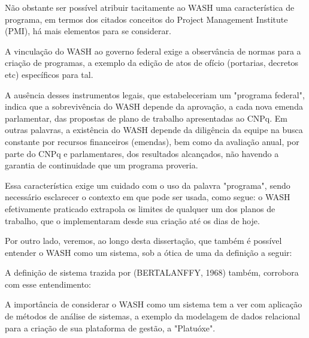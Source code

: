 Não obstante ser possível atribuir tacitamente ao WASH uma característica de programa, em termos dos citados conceitos do Project Management Institute (PMI), há mais elementos para se considerar.

A vinculação do WASH ao governo federal exige a observância de normas para a criação de programas, a exemplo da edição de atos de ofício (portarias, decretos etc) específicos para tal.

A ausência desses instrumentos legais, que estabeleceriam um "programa federal", indica que a sobrevivência do WASH depende da aprovação, a cada nova emenda parlamentar, das propostas de plano de trabalho apresentadas ao CNPq. Em outras palavras, a existência do WASH depende da diligência da equipe na busca constante por recursos financeiros (emendas), bem como da avaliação anual, por parte do CNPq e parlamentares, dos resultados alcançados, não havendo a garantia de continuidade que um programa proveria.

Essa característica exige um cuidado com o uso da palavra "programa", sendo necessário esclarecer o contexto em que pode ser usada, como segue: o WASH efetivamente praticado extrapola os limites de qualquer um dos planos de trabalho, que o implementaram desde sua criação até os dias de hoje.

Por outro lado, veremos, ao longo desta dissertação, que também é possível entender o WASH como um sistema, sob a ótica de uma da definição a seguir:


\noindent\begin{flushright}\mbox{\linespread{1}\selectfont\centering{}}\end{flushright}


A definição de sistema trazida por (BERTALANFFY, 1968) também, corrobora com esse entendimento:


\noindent\begin{flushright}\mbox{\linespread{1}\selectfont\centering{}}\end{flushright}


A importância de considerar o WASH como um sistema tem a ver com aplicação de métodos de análise de sistemas, a exemplo da modelagem de dados relacional para a criação de sua plataforma de gestão, a "Platuóxe".

